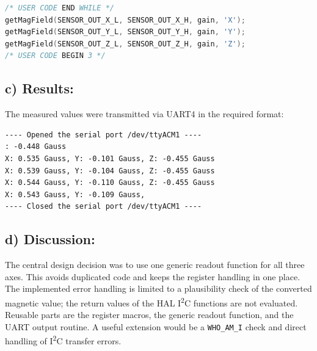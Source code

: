 \begin{lstlisting}[language=C,caption={Three-axis readout in the while-loop}]
/* USER CODE END WHILE */
getMagField(SENSOR_OUT_X_L, SENSOR_OUT_X_H, gain, 'X');
getMagField(SENSOR_OUT_Y_L, SENSOR_OUT_Y_H, gain, 'Y');
getMagField(SENSOR_OUT_Z_L, SENSOR_OUT_Z_H, gain, 'Z');
/* USER CODE BEGIN 3 */
\end{lstlisting}

\subsection{c) Results:}

The measured values were transmitted via UART4 in the required format:

\begin{lstlisting}[caption={UART output of the magnetic field values}]
---- Opened the serial port /dev/ttyACM1 ----
: -0.448 Gauss
X: 0.535 Gauss, Y: -0.101 Gauss, Z: -0.455 Gauss
X: 0.539 Gauss, Y: -0.104 Gauss, Z: -0.455 Gauss
X: 0.544 Gauss, Y: -0.110 Gauss, Z: -0.455 Gauss
X: 0.543 Gauss, Y: -0.109 Gauss,
---- Closed the serial port /dev/ttyACM1 ----
\end{lstlisting}

\subsection{d) Discussion:}

The central design decision was to use one generic readout function for all three axes. This avoids duplicated code and keeps the register handling in one place. The implemented error handling is limited to a plausibility check of the converted magnetic value; the return values of the HAL I\textsuperscript{2}C functions are not evaluated. Reusable parts are the register macros, the generic readout function, and the UART output routine. A useful extension would be a \texttt{WHO\_AM\_I} check and direct handling of I\textsuperscript{2}C transfer errors.

